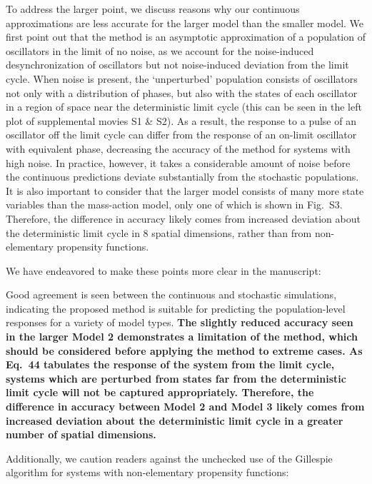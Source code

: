 \documentclass[11pt, letterpaper]{article}
\newenvironment{manuscript}[1]{\begin{center}\begin{tcolorbox}[colback=green!5!white,colframe=green!75!black,width=0.8\textwidth,title={#1},breakable,fonttitle=\bfseries]}{\end{tcolorbox}\end{center}}
\begin{document}
To address the larger point, we discuss reasons why our continuous approximations are less accurate for the larger model than the smaller model. 
We first point out that the method is an asymptotic approximation of a population of oscillators in the limit of no noise, as we account for the noise-induced desynchronization of oscillators but not noise-induced deviation from the limit cycle.
When noise is present, the `unperturbed' population consists of oscillators not only with a distribution of phases, but also with the states of each oscillator in a region of space near the deterministic limit cycle (this can be seen in the left plot of supplemental movies S1 \& S2).
As a result, the response to a pulse of an oscillator off the limit cycle can differ from the response of an on-limit oscillator with equivalent phase, decreasing the accuracy of the method for systems with high noise.
In practice, however, it takes a considerable amount of noise before the continuous predictions deviate substantially from the stochastic populations.
It is also important to consider that the larger model consists of many more state variables than the mass-action model, only one of which is shown in Fig.~S3.
Therefore, the difference in accuracy likely comes from increased deviation about the deterministic limit cycle in 8 spatial dimensions, rather than from non-elementary propensity functions.

We have endeavored to make these points more clear in the manuscript:

\begin{manuscript}{Supplemental Info, Page 6}
Good agreement is seen between the continuous and stochastic simulations, indicating the proposed method is suitable for predicting the population-level responses for a variety of model types.
{\bfseries The slightly reduced accuracy seen in the larger Model 2 demonstrates a limitation of the method, which should be considered before applying the method to extreme cases.
As Eq.~44 tabulates the response of the system from the limit cycle, systems which are perturbed from states far from the deterministic limit cycle will not be captured appropriately.
Therefore, the difference in accuracy between Model 2 and Model 3 likely comes from increased deviation about the deterministic limit cycle in a greater number of spatial dimensions.}
\end{manuscript}

Additionally, we caution readers against the unchecked use of the Gillespie algorithm for systems with non-elementary propensity functions:
\end{document}
